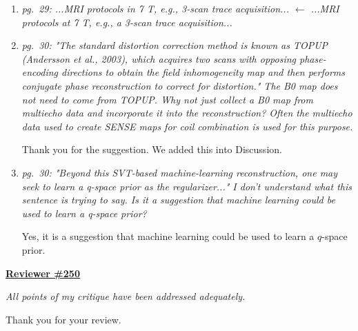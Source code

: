 \documentclass[a4paper,11pt,twoside]{report}
\begin{document}
\begin{enumerate}[resume]
    \item \textit{pg.~29: ...MRI protocols in 7 T, e.g., 3-scan trace acquisition... $\leftarrow$ ...MRI protocols at 7 T, e.g., a 3-scan trace acquisition...}
    \item \textit{pg.~30: "The standard distortion correction method is known as TOPUP (Andersson et al., 2003), which acquires two scans with opposing phase-encoding directions to obtain the field inhomogeneity map and then performs conjugate phase reconstruction to correct for distortion." The B0 map does not need to come from TOPUP. Why not just collect a B0 map from multiecho data and incorporate it into the reconstruction? Often the multiecho data used to create SENSE maps for coil combination is used for this purpose.}

    \hspace{1em} {\color{blue} Thank you for the suggestion.
    We added this into Discussion.}

    \item \textit{pg.~30: "Beyond this SVT-based machine-learning reconstruction, one may seek to learn a q-space prior as the regularizer..." I don't understand what this sentence is trying to say. Is it a suggestion that machine learning could be used to learn a q-space prior?}

    \hspace{1em} {\color{blue} Yes, it is a suggestion that machine learning
    could be used to learn a $q$-space prior.}
\end{enumerate}


\clearpage
\noindent \underline{\textbf{Reviewer \#250}}

\textit{All points of my critique have been addressed adequately.}

\hspace{1em} {\color{blue} Thank you for your review.}
\end{document}
